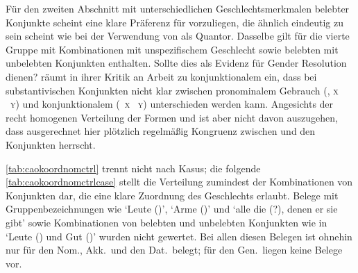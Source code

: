 Für den zweiten Abschnitt mit unterschiedlichen Geschlechtsmerkmalen belebter
Konjunkte scheint eine klare Präferenz für  vorzuliegen, die
ähnlich eindeutig zu sein scheint wie bei der Verwendung von  als
Quantor. Dasselbe gilt für die vierte Gruppe mit Kombinationen mit
unspezifischem Geschlecht sowie belebten mit unbelebten Konjunkten enthalten.
Sollte dies als Evidenz für Gender Resolution dienen? \citet[187]{gjelsten1980}
räumt in ihrer Kritik an  Arbeit zu konjunktionalem
 ein, dass bei substantivischen Konjunkten nicht klar zwischen
pronominalem Gebrauch (, \textsc{x} ~\textsc{y}) und
konjunktionalem (~\textsc{x} ~\textsc{y}) unterschieden
werden kann. Angesichts der recht homogenen Verteilung der Formen 
und  ist aber nicht davon auszugehen, dass ausgerechnet hier
plötzlich regelmäßig Kongruenz zwischen  und den Konjunkten
herrscht.

\cref{tab:caokoordnomctrl} trennt nicht nach Kasus; die folgende
\cref{tab:caokoordnomctrlcase} stellt die Verteilung zumindest der
Kombinationen von Konjunkten dar, die eine klare Zuordnung des Geschlechts
erlaubt. Belege mit Gruppenbezeichnungen wie  `Leute
(\MascA)',  `Arme (\MascA)' und  `alle die (\MascA?), denen er sie gibt' sowie Kombinationen von
belebten und unbelebten Konjunkten wie in  `Leute
(\MascA) und Gut (\NeutI)' wurden nicht gewertet. Bei allen diesen Belegen ist
ohnehin nur  für den Nom., Akk.\ und den Dat.\ belegt; für den
Gen.\ liegen keine Belege vor.

